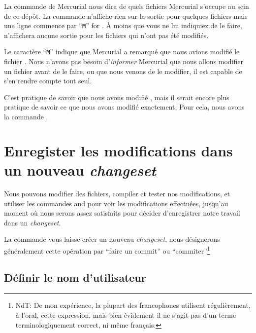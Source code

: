 
La commande  de Mercurial nous dira de quels fichiers Mercurial
s'occupe au sein de ce dépôt.
La commande  n'affiche rien sur la sortie pour quelques fichiers
mais une ligne commence par ``\texttt{M}'' for . À moins que
vous ne lui indiquiez de le faire,  n'affichera aucune sortie 
pour les fichiers qui n'ont pas été modifiés.

Le caractère ``\texttt{M}'' indique que Mercurial a remarqué que nous avions
modifié le fichier . Nous n'avons pas besoin d'\emph{informer}
Mercurial que nous allons modifier un fichier avant de le faire, ou que nous 
venons de le modifier, il est capable de s'en rendre compte tout seul.

C'est pratique de savoir que nous avons modifié , mais il
serait encore plus pratique de savoir ce que nous avons modifié exactement. Pour
cela, nous avons la commande  .


\section{Enregister les modifications dans un nouveau \textit{changeset}}

Nous pouvons modifier des fichiers, compiler et tester nos modifications,
et utiliser les commandes  and  pour voir les
modifications effectuées, jusqu'au moment où nous serons assez satisfaits
pour décider d'enregistrer notre travail dans un \textit{changeset}.

La commande  vous laisse créer un nouveau \textit{changeset},
nous désignerons généralement cette opération par ``faire un commit'' ou
``commiter''\footnote{NdT: De mon expérience, la plupart des francophones 
utilisent  régulièrement, à l'oral, cette expression, mais bien évidement
il ne s'agit pas d'un terme terminologiquement correct, ni même français.}

\subsection{Définir le nom d'utilisateur}


